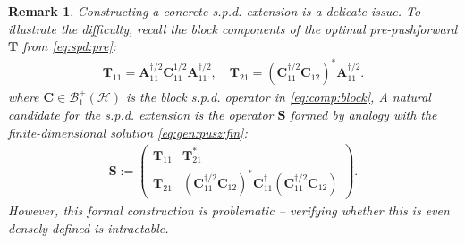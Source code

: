 \documentclass[noinfoline]{imsart}\setcounter{tocdepth}{2}
\newcommand{\m}[1]{\mathbf{#1}} %
\renewcommand{\c}[1]{\mathcal{#1}} %
\theoremstyle{plain}
\newtheorem{remark}{Remark}[section]
\begin{document}
\begin{remark}
Constructing a concrete s.p.d. extension is a delicate issue. To illustrate the difficulty, recall the block components of the optimal pre-pushforward $\m{T}$ from \eqref{eq:spd:pre}:
\begin{align*}
    \m{T}_{11} = \m{A}_{11}^{\dagger/2} \m{C}_{11}^{1/2} \m{A}_{11}^{\dagger/2}, \quad \m{T}_{21} = (\m{C}_{11}^{\dagger/2} \m{C}_{12})^{*} \m{A}_{11}^{\dagger/2}.
\end{align*}
where $\m{C} \in \c{B}_{1}^{+}(\c{H})$ is the block s.p.d. operator in \eqref{eq:comp:block}, 
A natural candidate for the s.p.d. extension is the operator $\m{S}$ formed by analogy with the finite-dimensional solution \eqref{eq:gen:pusz:fin}:
\begin{align*}
    \m{S} := \begin{pmatrix}
        \m{T}_{11} & \m{T}_{21}^{*} \\
        \m{T}_{21} & (\m{C}_{11}^{\dagger/2} \m{C}_{12})^{*} \m{C}_{11}^{\dagger} (\m{C}_{11}^{\dagger/2} \m{C}_{12})
    \end{pmatrix}.
\end{align*}
However, this formal construction is problematic -- verifying whether this is even densely defined is intractable.


\end{remark}
\end{document}
